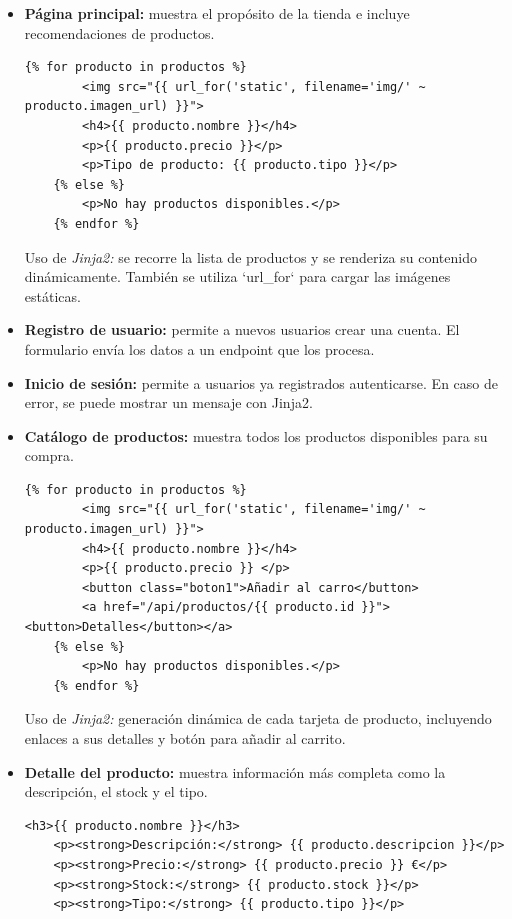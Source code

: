 \documentclass[10pt]{book}
\begin{document}
\begin{itemize}
    \item \textbf{Página principal:} muestra el propósito de la tienda e incluye recomendaciones de productos.
    
    \begin{lstlisting}[style=bonitoJinja]
    {% for producto in productos %}
        <img src="{{ url_for('static', filename='img/' ~ producto.imagen_url) }}">
        <h4>{{ producto.nombre }}</h4>
        <p>{{ producto.precio }}</p>
        <p>Tipo de producto: {{ producto.tipo }}</p>
    {% else %}
        <p>No hay productos disponibles.</p>
    {% endfor %}
    \end{lstlisting}

    Uso de \textit{Jinja2:} se recorre la lista de productos y se renderiza su contenido dinámicamente. También se utiliza `url\_for` para cargar las imágenes estáticas.

    \item \textbf{Registro de usuario:} permite a nuevos usuarios crear una cuenta. El formulario envía los datos a un endpoint que los procesa.

    \item \textbf{Inicio de sesión:} permite a usuarios ya registrados autenticarse. En caso de error, se puede mostrar un mensaje con Jinja2.

    \item \textbf{Catálogo de productos:} muestra todos los productos disponibles para su compra.

    \begin{lstlisting}[style=bonitoJinja]
    {% for producto in productos %}
        <img src="{{ url_for('static', filename='img/' ~ producto.imagen_url) }}">
        <h4>{{ producto.nombre }}</h4>
        <p>{{ producto.precio }} </p>
        <button class="boton1">Añadir al carro</button>
        <a href="/api/productos/{{ producto.id }}"><button>Detalles</button></a>
    {% else %}
        <p>No hay productos disponibles.</p>
    {% endfor %}
    \end{lstlisting}

    Uso de \textit{Jinja2:} generación dinámica de cada tarjeta de producto, incluyendo enlaces a sus detalles y botón para añadir al carrito.

    \item \textbf{Detalle del producto:} muestra información más completa como la descripción, el stock y el tipo.

    \begin{lstlisting}[style=bonitoJinja]
    <h3>{{ producto.nombre }}</h3>
    <p><strong>Descripción:</strong> {{ producto.descripcion }}</p>
    <p><strong>Precio:</strong> {{ producto.precio }} €</p>
    <p><strong>Stock:</strong> {{ producto.stock }}</p>
    <p><strong>Tipo:</strong> {{ producto.tipo }}</p>
    \end{lstlisting}


\end{itemize}
\end{document}
